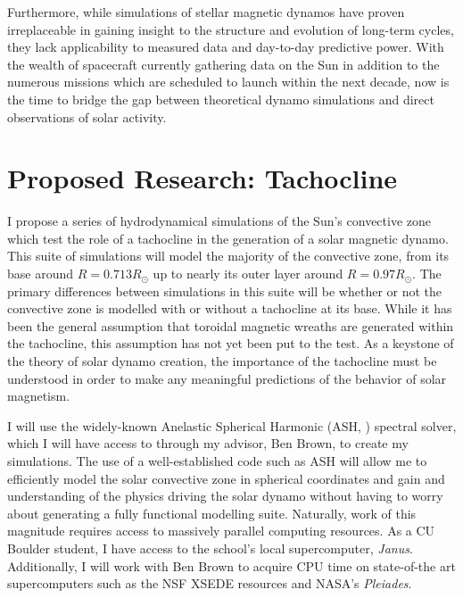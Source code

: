 \documentclass[aasms,12pt]{article}
\begin{document}
Furthermore, while simulations of stellar magnetic dynamos have proven
irreplaceable in gaining insight to the structure and evolution of 
long-term cycles, they lack applicability to measured data and day-to-day
predictive power.  With the wealth of spacecraft currently gathering data on
the Sun in addition to the numerous missions which are scheduled to launch
within the next decade, now is the time to bridge the gap between theoretical
dynamo simulations and direct observations of solar activity.

\section{Proposed Research: Tachocline}
I propose a series of hydrodynamical simulations of the Sun's convective zone
which test the role of a tachocline in the generation of a solar magnetic 
dynamo.  This suite of simulations will model the majority of the convective
zone, from its base around $R = 0.713R_{\odot}$ up to nearly its outer layer
around $R = 0.97R_{\odot}$.  The primary differences between simulations in this
suite will be whether or not the convective zone is modelled with or without a
tachocline at its base.  While it has been the general assumption that toroidal
magnetic wreaths are generated within the tachocline, this assumption has not 
yet been put to the test.  As a keystone of the theory of solar dynamo creation,
the importance of the tachocline must be understood in order to make any
meaningful predictions of the behavior of solar magnetism.

I will use the widely-known Anelastic Spherical Harmonic (ASH, 
\citealt{clune1999}) spectral solver, which I will have access to through my
advisor, Ben Brown, to create my simulations.  The use of a well-established
code such as ASH will allow me to
efficiently model the solar convective zone in spherical coordinates and gain
and understanding of the physics driving the solar dynamo without having to
worry about generating a fully functional modelling suite.  Naturally, work
of this magnitude requires access to massively parallel computing resources.
As a CU Boulder student, I have access to the school's local supercomputer,
\emph{Janus}.  Additionally, I will work with Ben Brown to acquire CPU time on
state-of-the art supercomputers such as the NSF XSEDE resources and NASA's
\emph{Pleiades}. 
\end{document}
